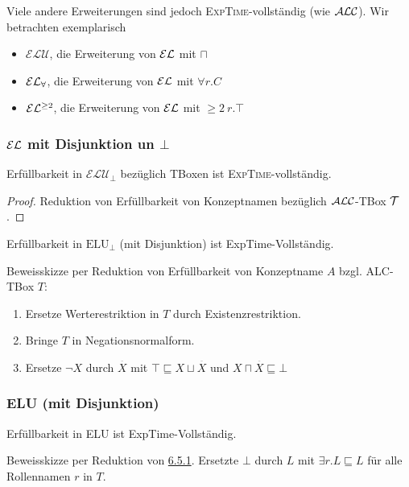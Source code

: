 Viele andere Erweiterungen sind jedoch \textsc{ExpTime}-vollständig (wie $\mathcal{A}\mathcal{L}\mathcal{C}$). Wir betrachten exemplarisch
\begin{itemize}
    \item $\mathcal{ELU}$, die Erweiterung von $\mathcal{E}\mathcal{L}$ mit $\sqcap$
    \item $\mathcal{E}\mathcal{L}_\forall$, die Erweiterung von $\mathcal{E}\mathcal{L}$ mit $\forall r.C$
    \item $\mathcal{E}\mathcal{L}^{\geq 2}$, die Erweiterung von $\mathcal{E}\mathcal{L}$ mit $\geq 2\ r.\top$
\end{itemize}


\subsubsection{\texorpdfstring{$\mathcal{E}\mathcal{L}$ mit Disjunktion un $\bot$}{EL mit Disjunktion und Bottom}}

\begin{theorem}
    Erfüllbarkeit in $\mathcal{ELU}_\bot$ bezüglich TBoxen ist \textsc{ExpTime}-vollständig.
\end{theorem}

\begin{proof}
    Reduktion von Erfüllbarkeit von Konzeptnamen bezüglich $\mathcal{A}\mathcal{L}\mathcal{C}$-TBox $\mathcal{T}$.

\end{proof}

Erfüllbarkeit in $\text{ELU}_{\bot}$ (mit Disjunktion) ist
ExpTime-Vollständig.

Beweisskizze per Reduktion von Erfüllbarkeit von Konzeptname $A$ bzgl.
ALC-TBox $T$:

\begin{enumerate}
\def\labelenumi{\arabic{enumi}.}
\item
  Ersetze Werterestriktion in $T$ durch Existenzrestriktion.
\item
  Bringe $T$ in Negationsnormalform.
\item
  Ersetze $\neg X$ durch $\overset{\overline{}}{X}$ mit
  $\top \sqsubseteq X \sqcup \overset{\overline{}}{X}$ und
  $X \sqcap \overset{\overline{}}{X} \sqsubseteq \bot$
\end{enumerate}

\subsubsection{ELU (mit Disjunktion)}\label{elu-mit-disjunktion}

Erfüllbarkeit in ELU ist ExpTime-Vollständig.

Beweisskizze per Reduktion von
\protect\hyperlink{el-mit-disjunktion-und-bottom}{6.5.1}. Ersetzte
$\bot$ durch $L$ mit $\exists r.L \sqsubseteq L$ für alle
Rollennamen $r$ in $T$.
